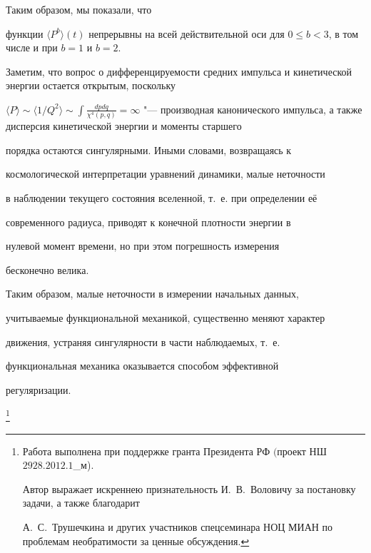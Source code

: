  Таким образом, мы показали, что

 функции $\langle P^b\rangle(t) $ непрерывны на всей действительной оси для $0\leqslant b < 3$, в том числе и при $ b = 1 $ и $ b = 2 $.



 Заметим, что вопрос о дифференцируемости средних импульса и кинетической энергии остается открытым, поскольку 

 $ \displaystyle \langle P\rangle\sim\langle 1/Q^2\rangle\sim\int\frac{dp dq}{\chi^4(p, q)} =\infty $ "--- производная канонического импульса, а также  дисперсия кинетической  энергии и моменты старшего

порядка остаются сингулярными. Иными словами, возвращаясь к

космологической интерпретации уравнений динамики, малые неточности

в наблюдении текущего состояния вселенной, т.~е. при определении её

современного радиуса, приводят к конечной плотности энергии в

нулевой момент времени, но при этом погрешность измерения

бесконечно велика.





 Таким образом, малые неточности в измерении начальных данных,

учитываемые функциональной механикой, существенно меняют характер

движения, устраняя сингулярности  в части наблюдаемых, т.~е.

функциональная механика оказывается способом эффективной

регуляризации.




\thanks{

Работа выполнена при поддержке гранта Президента РФ $($проект НШ \rm \No~$2928.2012.1$\_м).



\smallskip



 Автор выражает искреннею признательность И.~В.~Воловичу за постановку задачи, а также благодарит  

А.~С.~Трушечкина   и других участников спецсеминара НОЦ МИАН по проблемам необратимости за ценные обсуждения. 

}

